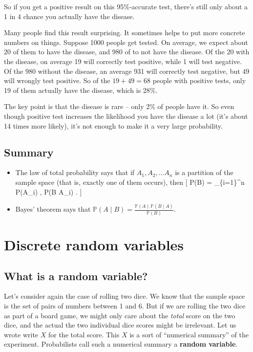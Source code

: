 \documentclass[
  letterpaper,
  DIV=11,
  numbers=noendperiod]{scrreprt}
\providecommand{\tightlist}{%
  \setlength{\itemsep}{0pt}\setlength{\parskip}{0pt}}\usepackage{longtable,booktabs,array}
\theoremstyle{remark}
\begin{document}
So if you get a positive result on this 95\%-accurate test, there's
still only about a 1 in 4 chance you actually have the disease.

Many people find this result surprising. It sometimes helps to put more
concrete numbers on things. Suppose 1000 people get tested. On average,
we expect about 20 of them to have the disease, and 980 of to not have
the disease. Of the 20 with the disease, on average 19 will correctly
test positive, while 1 will test negative. Of the 980 without the
disease, an average 931 will correctly test negative, but 49 will
wrongly test positive. So of the \(19+49 = 68\) people with positive
tests, only 19 of them actually have the disease, which is 28\%.

The key point is that the disease is rare -- only 2\% of people have it.
So even though positive test increases the likelihood you have the
disease a lot (it's about 14 times more likely), it's not enough to make
it a very large probability.

\hypertarget{summary-L08}{%
\section*{Summary}\label{summary-L08}}


\begin{itemize}
\tightlist
\item
  The law of total probability says that if \(A_1, A_2, \dots A_n\) is a
  partition of the sample space (that is, exactly one of them occurs),
  then {[} \mathbb P(B) = \sum\_\{i=1\}\^{}n \mathbb P(A\_i) ,
  \mathbb P(B \mid A\_i) . {]}
\item
  Bayes' theorem says that
  \({\displaystyle \mathbb P(A \mid B) = \frac{\mathbb P(A) \,\mathbb P(B \mid A)}{\mathbb P(B)} }\).
\end{itemize}

\hypertarget{L09-discrete-rv}{%
\chapter{Discrete random variables}\label{L09-discrete-rv}}

\hypertarget{rv}{%
\section{What is a random variable?}\label{rv}}

Let's consider again the case of rolling two dice. We know that the
sample space is the set of pairs of numbers between 1 and 6. But if we
are rolling the two dice as part of a board game, we might only care
about the \emph{total} score on the two dice, and the actual the two
individual dice scores might be irrelevant. Let us wrote write \(X\) for
the total score. This \(X\) is a sort of ``numerical summary'' of the
experiment. Probabilists call such a numerical summary a \textbf{random
variable}.
\end{document}
